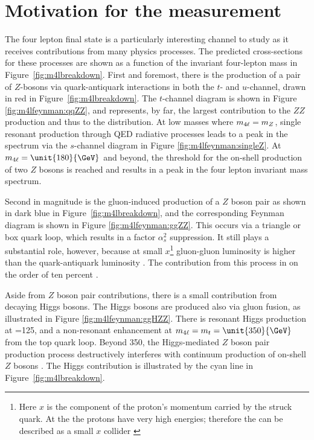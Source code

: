 
\section{Motivation for the \mFourL{} measurement}
\label{sec:fourlepmotivation}

The four lepton final state is a particularly interesting channel to study as it receives contributions from many physics processes. The predicted cross-sections for these processes are shown as a function of the invariant four-lepton mass in Figure~\ref{fig:m4lbreakdown}. First and foremost, there is the production of a pair of $Z$-bosons via quark-antiquark interactions in both the $t$- and $u$-channel, drawn in red in Figure~\ref{fig:m4lbreakdown}. The $t$-channel diagram is shown in Figure \ref{fig:m4lfeynman:qqZZ}, and represents, by far, the largest contribution to the $ZZ$ production and thus to the \mFourL{} distribution. At low masses where $m_{4\ell}{}=m_{Z}$, single resonant \ZFourL{} production through QED radiative processes leads to a peak in the spectrum via the $s$-channel diagram in Figure \ref{fig:m4lfeynman:singleZ}. At $\mFourL{}=\unit{180}{\GeV}$ and beyond, the threshold for the on-shell production of two $Z$ bosons is reached and results in a peak in the four lepton invariant mass spectrum. 

Second in magnitude is the gluon-induced production of a $Z$ boson pair as shown in dark blue in Figure~\ref{fig:m4lbreakdown}, and the corresponding Feynman diagram is shown in Figure \ref{fig:m4lfeynman:ggZZ}. This occurs via a triangle or box quark loop, which results in a factor $\alpha_s^2$ suppression. It still plays a substantial role, however, because at small $x$\footnote{Here $x$ is the component of the proton's momentum carried by the struck quark. At the \LHC the protons have very high energies; therefore the \LHC can be described as a small $x$ collider \cite{zotov2012small}} gluon-gluon luminosity is higher than the quark-antiquark luminosity \cite{Glover:194539}. The contribution from this process in on the order of ten percent \cite{Becker:2230817}. 

Aside from $Z$ boson pair contributions, there is a small contribution from decaying Higgs bosons. The Higgs bosons are produced also via gluon fusion, as illustrated in Figure \ref{fig:m4lfeynman:ggHZZ}. There is resonant Higgs production at \mFourL=\unit{125}{\GeV}, and a non-resonant enhancement at $\mFourL{}=m_{t}=\unit{350}{\GeV}$ from the top quark loop. Beyond \unit{350}{\GeV}, the Higgs-mediated $Z$ boson pair production process destructively interferes with continuum production of on-shell $Z$ bosons \cite{Campbell_2016}. The Higgs contribution is illustrated by the cyan line in Figure~\ref{fig:m4lbreakdown}.


